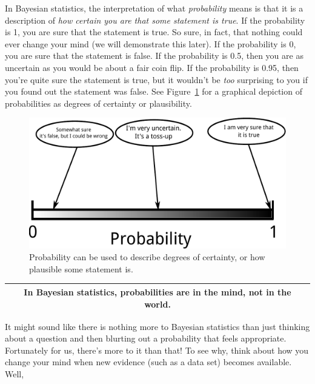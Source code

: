 In Bayesian statistics, the interpretation of what {\it probability} means is
that it is a description of {\it how certain you are that some statement is
true}.
If the probability is 1, you are sure that the statement is true. So sure, in
fact, that nothing could ever change your mind (we will demonstrate this later).
If the probability is 0, you
are sure that the statement is false. If the probability is 0.5, then you
are as uncertain as you would be about a fair coin flip. If the probability is
0.95, then you're quite sure the statement is true, but it wouldn't be {\it too}
surprising to you if you found out the statement was false. See
Figure~\ref{fig:probability_scale} for a graphical depiction of probabilities
as degrees of certainty or plausibility.

\begin{figure}
\begin{center}
\includegraphics[scale=0.6]{Figures/probability_scale.pdf}
\caption{Probability can be used to describe degrees of certainty, or
how plausible some statement is.\label{fig:probability_scale}}
\end{center}
\end{figure}

\begin{center}
\begin{tabular}{|c|}
\hline
{\bf In Bayesian statistics, probabilities are in the mind, not in the world.}\\
\hline
\end{tabular}
\end{center}

It might sound like there is nothing more to Bayesian statistics than just
thinking about a question and then blurting out a probability that feels
appropriate. Fortunately for us, there's more to it than that! To see why, think
about how you change your mind when new evidence (such as a data set) becomes
available. Well, 





